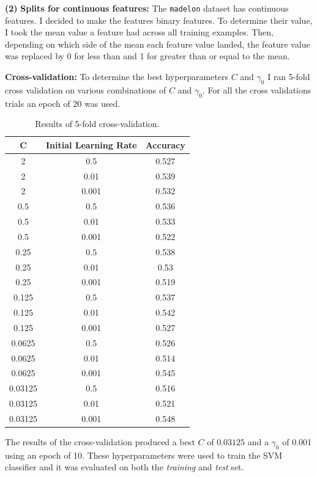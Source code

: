 \documentclass[11pt]{article}
\renewcommand\part[1]{\vspace{.10in}\textbf{(#1)}}
\begin{document}
\part{2} \textbf{Splits for continuous features:} The {\tt madelon} dataset has continuous features. I decided to make the features binary features. To determine their value, I took the mean value a feature had across all training examples. Then, depending on which side of the mean each feature value landed, the feature value was replaced by 0 for less than and 1 for greater than or equal to the mean.

\textbf{Cross-validation:} To determine the best hyperparameters $C$ and $\gamma_0$ I ran 5-fold cross validation on various combinations of $C$ and $\gamma_0$. For all the cross validations trials an epoch of $20$ was used.

 \begin{table}[H]
\centering
{\renewcommand{\arraystretch}{1.2}%
\begin{tabular}{| c | c | c |}
\hline
C & Initial Learning Rate & Accuracy\\
\hline
2 & 0.5 & 0.527\\ \hline
2 & 0.01 & 0.539\\ \hline
2 & 0.001 & 0.532\\ \hline
0.5 & 0.5 & 0.536\\ \hline
0.5 & 0.01 & 0.533\\ \hline
0.5 & 0.001 & 0.522\\ \hline
0.25 & 0.5 & 0.538\\ \hline
0.25 & 0.01 & 0.53\\ \hline
0.25 & 0.001 & 0.519\\ \hline
0.125 & 0.5 & 0.537\\ \hline
0.125 & 0.01 & 0.542\\ \hline
0.125 & 0.001 & 0.527\\ \hline
0.0625 & 0.5 & 0.526\\ \hline
0.0625 & 0.01 & 0.514\\ \hline
0.0625 & 0.001 & 0.545\\ \hline
0.03125 & 0.5 & 0.516\\ \hline
0.03125 & 0.01 & 0.521\\ \hline
0.03125 & 0.001 & 0.548\\ \hline
\end{tabular}}
\caption{Results of 5-fold cross-validation.}
\end{table}

The results of the cross-validation produced a best $C$ of $0.03125$ and a $\gamma_0$ of 0.001 using an epoch of 10. These hyperparameters were used to train the SVM classifier and it was evaluated on both the \textit{training} and \textit{test} set.
\end{document}
